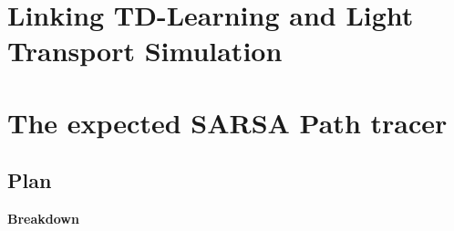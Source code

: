 \documentclass[ %
                    author={Callum Pearce},
                supervisor={Dr. Neill Campbell},
                    degree={MEng},
                     title={How effective are Temporal difference learning methods for reducing the number of zero contribution light paths while still accurately approximating Global Illumination in Path tracing?},
                  subtitle={},
                      type={research},
                      year={2019} ]{dissertation}
\begin{document}
\section{Linking TD-Learning and Light Transport Simulation}

\section{The expected SARSA Path tracer}

\subsection{Plan}
\textbf{Breakdown}
\end{document}

